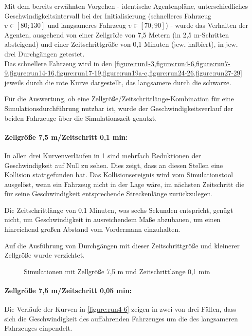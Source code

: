 Mit dem bereits erwähnten Vorgehen - identische Agentenpläne, unterschiedliches Geschwindigkeitsintervall bei der Initialisierung (schnelleres Fahrzeug $ v \in [80; 130] $ und langsameres Fahrzeug $ v \in [70; 90] $) - wurde das Verhalten der Agenten, ausgehend von einer Zellgröße von 7,5 Metern (in 2,5 m-Schritten absteigend) und einer Zeitschrittgröße von 0,1 Minuten (jew. halbiert), in jew. drei Durchgängen getestet.
\\
Das schnellere Fahrzeug wird in den \cref{figure:run1-3,figure:run4-6,figure:run7-9,figure:run14-16,figure:run17-19,figure:run19a-c,figure:run24-26,figure:run27-29} jeweils durch die rote Kurve dargestellt, das langsamere durch die schwarze.

Für die Auswertung, ob eine Zellgröße/Zeitschrittlänge-Kombination für eine Simulationsdurchführung nutzbar ist, wurde der Geschwindigkeitsverlauf der beiden Fahrzeuge über die Simulationszeit genutzt.


\paragraph*{Zellgröße 7,5 m/Zeitschritt 0,1 min:}
In allen drei Kurvenverläufen in \cref{figure:run1-3} sind mehrfach Reduktionen der Geschwindigkeit auf Null zu sehen. 
Dies zeigt, dass an diesen Stellen eine Kollision stattgefunden hat. Das Kollisionsereignis wird vom Simulationstool ausgelöst, wenn ein Fahrzeug nicht in der Lage wäre, im nächsten Zeitschritt die für seine Geschwindigkeit entsprechende Streckenlänge zurückzulegen.

Die Zeitschrittlänge von 0,1 Minuten, was sechs Sekunden entspricht, genügt nicht, um Geschwindigkeit in ausreichendem Maße abzubauen, um einen hinreichend großen Abstand vom Vordermann einzuhalten.

Auf die Ausführung von Durchgängen mit dieser Zeitschrittgröße und kleinerer Zellgröße wurde verzichtet.
\begin{figure}[hptb]
  \centering 
   \qquad 
   \qquad 
  \caption{Simulationen mit Zellgröße 7,5 m und Zeitschrittlänge 0,1 min} 
  \label{figure:run1-3}
\end{figure}


\paragraph*{Zellgröße 7,5 m/Zeitschritt 0,05 min:}
Die Verläufe der Kurven in \cref{figure:run4-6} zeigen in zwei von drei Fällen, dass sich die Geschwindigkeit des auffahrenden Fahrzeuges um die des langsameren Fahrzeuges einpendelt.

